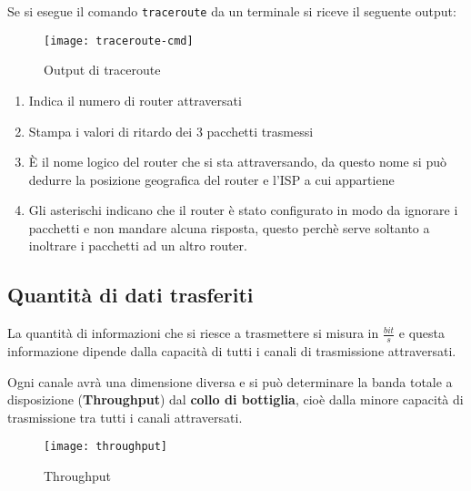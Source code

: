 \documentclass[a4paper]{article}
\begin{document}
\noindent
Se si esegue il comando \texttt{traceroute} da un terminale si riceve il seguente output:
\begin{figure}[H]
  \centering
  \texttt{[image: traceroute-cmd]}
  \caption{Output di traceroute}
\end{figure}

\begin{enumerate}
  \item Indica il numero di router attraversati
  \item Stampa i valori di ritardo dei 3 pacchetti trasmessi
  \item È il nome logico del router che si sta attraversando, da questo nome si può
    dedurre la posizione geografica del router e l'ISP a cui appartiene
  \item Gli asterischi indicano che il router è stato configurato in modo da ignorare
    i pacchetti e non mandare alcuna risposta, questo perchè serve soltanto a inoltrare
    i pacchetti ad un altro router.
\end{enumerate}


\subsection{Quantità di dati trasferiti}
La quantità di informazioni che si riesce a trasmettere si misura in \( \frac{bit}{s} \)
e questa informazione dipende dalla capacità di tutti i canali di trasmissione
attraversati.

\noindent
Ogni canale avrà una dimensione diversa e si può determinare la banda totale a
disposizione (\textbf{Throughput}) dal \textbf{collo di bottiglia}, cioè dalla minore
capacità di trasmissione tra tutti i canali attraversati.
\begin{figure}[H]
  \centering
  \texttt{[image: throughput]}
  \caption{Throughput}
\end{figure}
\end{document}
